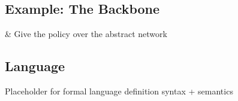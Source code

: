 \documentclass{sig-alternate-10pt}
\newcommand{\sysname}{{\small \sf Methane}\xspace}
\newcommand{\CD}[1]{\texttt{\small #1}}  %
\newcommand{\KW}[1]{\texttt{\small\bfseries{#1}}}
\newcommand{\Define}{\KW{define}}
\newcommand{\Prefer}{\texttt{>>}}
\newcommand{\Exit}{\KW{exit}}
\begin{document}
\subsection{Example: The Backbone}

\begin{easylist}[itemize]
& Give the policy over the abstract network
\end{easylist}

\subsection{Language}

Placeholder for formal language definition syntax + semantics


\end{document}
